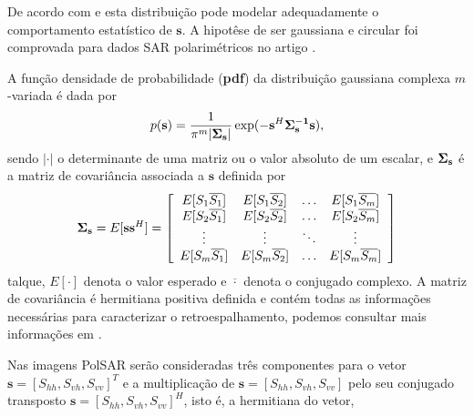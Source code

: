 De acordo com \citet{good} e \citet{lee} esta distribuição pode modelar adequadamente o comportamento estatístico de $\mathbf{s}$. A hipotêse de ser gaussiana e circular foi comprovada para dados SAR polarimétricos no artigo \citet{sarabendi}.   

A função densidade de probabilidade ({\bf pdf}) da distribuição gaussiana complexa $m$-variada é dada por
\begin{equation}\label{cap_acf_4}
    p({\bf s})=\frac{1}{\pi^m|\bf{\Sigma}_{{\bf s}}|}\exp(-{\bf s}^{H}\bf{\Sigma}_{{\bf s}}^{-1}{\bf s}), 
\end{equation}
sendo $|\cdot|$ o determinante de uma matriz ou o valor absoluto de um escalar, e $\mathbf{\Sigma}_{\bf{s}}$ é a matriz de covariância associada a $\mathbf{s}$ definida por
\begin{equation}\label{cap_acf_5}
	{\bf \Sigma_{{\bf s}}} = E[{\mathbf s}{\mathbf s}^H] = \left[
\begin{array}{cccc}
	E[S_1\overline{S_1}]  & E[{S_1}\overline{S_2}] &\hdots & E[S_1\overline{S_m}] \\
	E[S_2\overline{S_1}]  & E[{S_2}\overline{S_2}] &\hdots &E[S_2\overline{S_m}]\\
        \vdots&\vdots &\ddots &\vdots\\
	E[S_m\overline{S_1}]  & E[S_m\overline{S_2}] &\hdots &E[S_m\overline{S_m}]\\
\end{array}
\right]
\end{equation}
talque, $E[\cdot]$ denota o valor esperado e $\overline{\cdot}$ denota o conjugado complexo. A matriz de covariância é hermitiana positiva definida e contém todas as informações necessárias para caracterizar o retroespalhamento, podemos consultar mais informações em \citep{mfp}. 

Nas imagens PolSAR serão consideradas três componentes para o vetor $\mathbf{s}=[S_{hh},S_{vh},S_{vv}]^T$ e a multiplicação de $\mathbf{s}=[S_{hh},S_{vh},S_{vv}]$ pelo seu conjugado transposto $\mathbf{s}=[S_{hh},S_{vh},S_{vv}]^H$, isto é, a hermitiana do vetor, 

